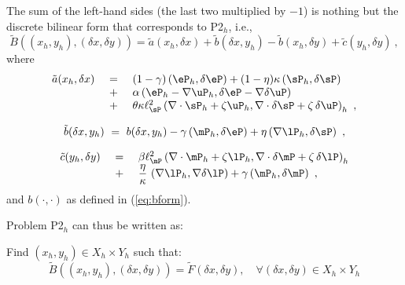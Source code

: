 The sum of the left-hand sides (the last two multiplied by $-1$) is nothing but the discrete bilinear form that corresponds to P2$_h$, i.e.,
\begin{equation}
\tilde{B}((x_h,y_h),(\delta x,\delta y))=\tilde{a}(x_h,\delta x)+\tilde{b}(\delta x,y_h)-\tilde{b}(x_h,\delta y)+\tilde{c}(y_h,\delta y)~,
\end{equation}
where
\begin{equation}
	\begin{array}{rcl}
		\tilde{a}(x_h,\delta x)~&=&~(1-\gamma)\left (\eP_h,\delta \eP\right )+(1-\eta)\kappa \left ( \sP_h,\delta \sP \right ) \\
		~&+&~\alpha \left( \eP_h-\nabla \uP_h, \delta \eP - \nabla \delta \uP \right)\\
		~&+&~ \theta \kappa \ell_{\sP}^2  \left ( \nabla \cdot \sP_h + \zeta \uP_h , \nabla \cdot \delta \sP + \zeta \, \delta \uP \right )_h~,
	\end{array}
\end{equation}

\begin{equation}
	\begin{aligned}
		\tilde{b}(\delta x,y_h)~=~b(\delta x,y_h)-\gamma \left (\mP_h,\delta \eP\right )+\eta \left (\nabla \lP_h,\delta \sP \right ) ~,
	\end{aligned}
\end{equation}

\begin{equation}
	\begin{array}{rcl}
		\tilde{c}(y_h,\delta y) ~&=&~  \beta \ell_{\mP}^2 \left ( \nabla \cdot \mP_h + \zeta \lP_h , \nabla \cdot \delta \mP + \zeta\,\delta \lP \right )_h \\
		~&+&~\dfrac{\eta}{\kappa}\,\left ( \nabla \lP_h,\nabla \delta \lP \right ) + \gamma \left ( \mP_h,\delta \mP \right )~,
	\end{array}
\end{equation}
and $b(\cdot,\cdot)$ as defined in (\ref{eq:bform}).

Problem P2$_h$ can thus be written as:

\begin{tcolorbox}[colback=black!10!white, boxrule=0pt, halign=justify]
	Find $(x_h,y_h)\in X_h \times Y_h$ such that:
	\begin{equation}
		\tilde{B}\left ( \left ( x_h,y_h \right ),\left ( \delta x,\delta y \right ) \right )= \tilde{F}(\delta x,\delta y), \quad \forall (\delta x, \delta y)\in X_h\times Y_h
		\label{eq:BzF}
	\end{equation}
\end{tcolorbox}

